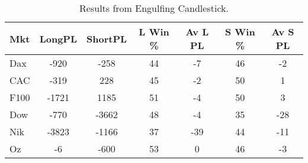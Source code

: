 \begin{table}[ht]
\centering
\caption[Engulfing Candlestick System]{Results from Engulfing Candlestick.} 
\label{tab:engulf_results}
\begin{tabular}{lcccccc}
  \toprule Mkt & LongPL & ShortPL & L Win \% & Av L PL & S Win \% & Av S PL \\ 
  \midrule Dax & -920 & -258 & 44 & -7 & 46 & -2 \\ 
  CAC & -319 & 228 & 45 & -2 & 50 & 1 \\ 
  F100 & -1721 & 1185 & 51 & -4 & 50 & 3 \\ 
  Dow & -770 & -3662 & 48 & -4 & 35 & -28 \\ 
  Nik & -3823 & -1166 & 37 & -39 & 44 & -11 \\ 
  Oz & -6 & -600 & 53 & 0 & 46 & -3 \\ 
   \bottomrule \end{tabular}
\end{table}
